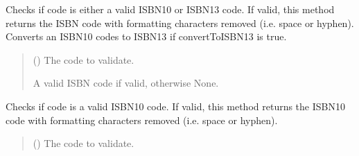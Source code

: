 \documentclass[letterpaper,10pt,english]{sphinxmanual}
\begin{document}
\begin{fulllineitems}

\begin{fulllineitems}
\label{\detokenize{apache_commons_validator_python.routines:apache_commons_validator_python.routines.isbn_validator.ISBNValidator.validate}}
\pysigstartsignatures
{}
\pysigstopsignatures
\sphinxAtStartPar
Checks if code is either a valid ISBN\sphinxhyphen{}10 or ISBN\sphinxhyphen{}13 code. If valid, this
method returns the ISBN code with formatting characters removed (i.e. space or
hyphen). Converts an ISBN\sphinxhyphen{}10 codes to ISBN\sphinxhyphen{}13 if convertToISBN13 is true.
\begin{quote}\begin{description}
\sphinxAtStartPar
{} () \textendash{} The code to validate.

\sphinxAtStartPar
A valid ISBN code if valid, otherwise None.

\end{description}\end{quote}

\end{fulllineitems}


\begin{fulllineitems}
\label{\detokenize{apache_commons_validator_python.routines:apache_commons_validator_python.routines.isbn_validator.ISBNValidator.validate_isbn10}}
\pysigstartsignatures
{}
\pysigstopsignatures
\sphinxAtStartPar
Checks if code is a valid ISBN\sphinxhyphen{}10 code. If valid, this method returns the
ISBN\sphinxhyphen{}10 code with formatting characters removed (i.e. space or hyphen).
\begin{quote}\begin{description}
\sphinxAtStartPar
{} () \textendash{} The code to validate.


\end{description}
\end{quote}
\end{fulllineitems}
\end{fulllineitems}
\end{document}

